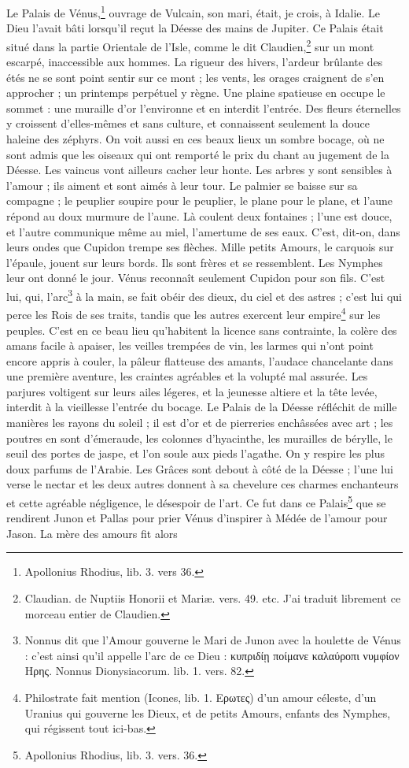 \documentclass[a4paper, 18pt, oneside]{article}
\begin{document}
Le Palais de Vénus,\footnote{Apollonius Rhodius, lib. 3. vers 36.} ouvrage de Vulcain, son mari, était, je crois, à Idalie. Le Dieu l'avait bâti lorsqu'il reçut la Déesse des mains de Jupiter. Ce Palais était situé dans la partie Orientale de l'Isle, comme le dit Claudien,\footnote{Claudian. de Nuptiis Honorii et Mariæ. vers. 49. etc. J'ai traduit librement ce morceau entier de Claudien.} sur un mont escarpé, inaccessible aux hommes. La rigueur des hivers, l'ardeur brûlante des étés ne se sont point sentir sur ce mont ; les vents, les orages craignent de s'en approcher ; un printemps perpétuel y règne. Une plaine spatieuse en occupe le sommet : une muraille d'or l'environne et en interdit l'entrée. Des fleurs éternelles y croissent d'elles-mêmes et sans culture, et connaissent seulement la douce haleine des zéphyrs. On voit aussi en ces beaux lieux un sombre bocage, où ne sont admis que les oiseaux qui ont remporté le prix du chant au jugement de la Déesse. Les vaincus vont ailleurs cacher leur honte. Les arbres y sont sensibles à l'amour ; ils aiment et sont aimés à leur tour. Le palmier se baisse sur sa compagne ; le peuplier soupire pour le peuplier, le plane pour le plane, et l'aune répond au doux murmure de l'aune. Là coulent deux fontaines ; l'une est douce, et l'autre communique même au miel, l'amertume de ses eaux. C'est, dit-on, dans leurs ondes que Cupidon trempe ses flèches. Mille petits Amours, le carquois sur l'épaule, jouent sur leurs bords. Ils sont frères et se ressemblent. Les Nymphes leur ont donné le jour. Vénus reconnaît seulement Cupidon pour son fils. C'est lui, qui, l'arc\footnote{Nonnus dit que l'Amour gouverne le Mari de Junon avec la houlette de Vénus : c'est ainsi qu'il appelle l'arc de ce Dieu : κυπριδίῃ ποίμανε καλαύροπι νυμφίον Ηρης. Nonnus Dionysiacorum. lib. 1. vers. 82.} à la main, se fait obéir des dieux, du ciel et des astres ; c'est lui qui perce les Rois de ses traits, tandis que les autres exercent leur empire\footnote{Philostrate fait mention (Icones, lib. 1. Ερωτες) d'un amour céleste, d'un Uranius qui gouverne les Dieux, et de petits Amours, enfants des Nymphes, qui régissent tout ici-bas.} sur les peuples. C'est en ce beau lieu qu'habitent la licence sans contrainte, la colère des amans facile à apaiser, les veilles trempées de vin, les larmes qui n'ont point encore appris à couler, la pâleur flatteuse des amants, l'audace chancelante dans une première aventure, les craintes agréables et la volupté mal assurée. Les parjures voltigent sur leurs ailes légeres, et la jeunesse altiere et la tête levée, interdit à la vieillesse l'entrée du bocage. Le Palais de la Déesse réfléchit de mille manières les rayons du soleil ; il est d'or et de pierreries enchâssées avec art ; les poutres en sont d'émeraude, les colonnes d'hyacinthe, les murailles de bérylle, le seuil des portes de jaspe, et l'on soule aux pieds l'agathe. On y respire les plus doux parfums de l'Arabie. Les Grâces sont debout à côté de la Déesse ; l'une lui verse le nectar et les deux autres donnent à sa chevelure ces charmes enchanteurs et cette agréable négligence, le désespoir de l'art. Ce fut dans ce Palais\footnote{Apollonius Rhodius, lib. 3. vers. 36.} que se rendirent Junon et Pallas pour prier Vénus d'inspirer à Médée de l'amour pour Jason. La mère des amours fit alors 
\end{document}

